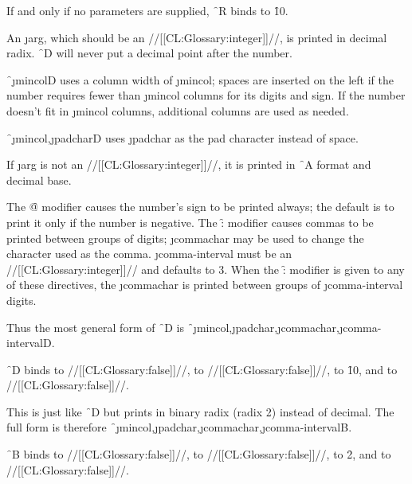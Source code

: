 If and only if no parameters are supplied, \f{~R} binds  to \f{10}.

\endsubsubsection%

 

An \j{arg}, which should be an //[[CL:Glossary:integer]]//,  is printed in decimal radix. \f{~D} will never put a decimal point after the number.

\f{~\j{mincol}D} uses  a column width of \j{mincol}; spaces are inserted on the left if the number requires fewer than \j{mincol} columns for its digits and sign.  If the number doesn't fit in \j{mincol} columns, additional columns are used as needed.

\f{~\j{mincol},\j{padchar}D} uses \j{padchar} as the pad character instead of space.

If \j{arg} is not an //[[CL:Glossary:integer]]//, it is printed in \f{~A} format and decimal base.

The \f{@} modifier causes the number's sign to be printed always; the default is to print it only if the number is negative.  The \f{:} modifier causes commas to be printed between groups of digits; \j{commachar} may be used to change the character used as the comma. \j{comma-interval}  must be an //[[CL:Glossary:integer]]// and defaults to 3.  When the \f{:}  modifier is given to any of these directives, the \j{commachar}  is printed between groups of \j{comma-interval} digits.

Thus the most general form of \f{~D} is \f{~\j{mincol},\j{padchar},\j{commachar},\j{comma-interval}D}.

 \f{~D} binds
      to //[[CL:Glossary:false]]//,
      to //[[CL:Glossary:false]]//,
      to \f{10}, 
 and  to //[[CL:Glossary:false]]//.

\endsubsubsection%

 

This is just like \f{~D} but prints in binary radix (radix 2) instead of decimal.  The full form is therefore \f{~\j{mincol},\j{padchar},\j{commachar},\j{comma-interval}B}.

 \f{~B} binds
      to //[[CL:Glossary:false]]//,
      to //[[CL:Glossary:false]]//,
      to \f{2}, 
 and  to //[[CL:Glossary:false]]//.

